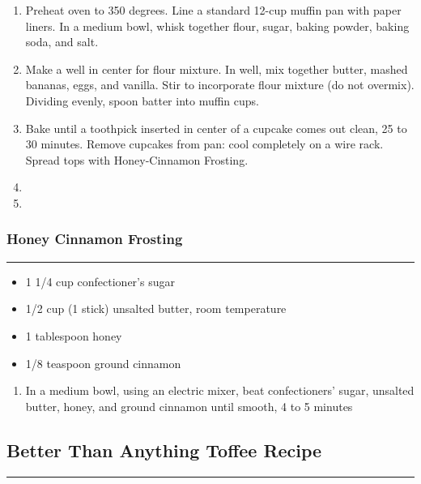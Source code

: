 \documentclass{article}
\begin{document}
\begin{enumerate}
    \item 
        Preheat oven to 350 degrees. Line a standard 12-cup muffin pan with paper liners. In a medium bowl, whisk together flour, sugar, baking powder, baking soda, and salt.
    \item 
        Make a well in center for flour mixture. In well, mix together butter, mashed bananas, eggs, and vanilla. Stir to incorporate flour mixture (do not overmix). Dividing evenly, spoon batter into muffin cups.
    \item 
        Bake until a toothpick inserted in center of a cupcake comes out clean, 25 to 30 minutes. Remove cupcakes from pan: cool completely on a wire rack. Spread tops with Honey-Cinnamon Frosting.
    \item 
    \item 
\end{enumerate}

\subsubsection{Honey Cinnamon Frosting}
\noindent\rule[0.5ex]{\linewidth}{0.5pt}

\begin{framed}
    \begin{itemize}
        \item 1 1/4 cup confectioner's sugar 
        \item 1/2 cup (1 stick) unsalted butter, room temperature
        \item 1 tablespoon honey
        \item 1/8 teaspoon ground cinnamon
    \end{itemize}
\end{framed}

\begin{enumerate}
    \item 
        In a medium bowl, using an electric mixer, beat confectioners' sugar, unsalted butter, honey, and ground cinnamon until smooth, 4 to 5 minutes
\end{enumerate}
\newpage

\subsection{Better Than Anything Toffee Recipe} 
\noindent\rule[0.5ex]{\linewidth}{1pt}
\end{document}
